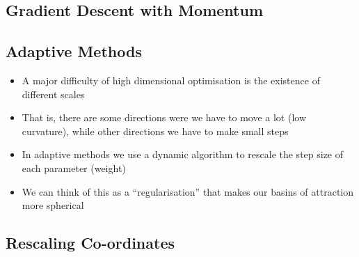 
\begin{slide}
\section{Gradient Descent with Momentum}

\pb\pause{}
\begin{center}
  \pause
\end{center}
\end{slide}


\begin{slide}
  \section{Adaptive Methods}

  \begin{PauseHighLight}
    \begin{itemize}
    \item A major difficulty of high dimensional optimisation is the
      existence of different scales\pause
    \item That is, there are some directions were we have to move a
      lot (low curvature), while other directions we have to make small
      steps\pause
    \item In adaptive methods we use a dynamic algorithm to rescale
      the step size of each parameter (weight)\pause
    \item We can think of this as a ``regularisation'' that makes our
      basins of attraction more spherical\pause
    \end{itemize}
  \end{PauseHighLight}

\end{slide}


\begin{slide}
\section[-2]{Rescaling Co-ordinates}

\pb{}\pause{}
\begin{center}
  \pause
\end{center}
\end{slide}

